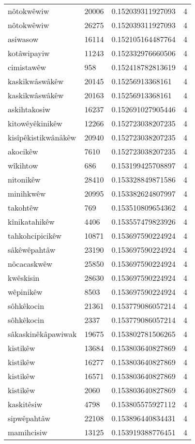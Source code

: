 \begin{longtable}{llll}
nôtokwêwiw & 20006 & 0.152039311927093 & 4 \\
nôtokwêwiw & 26275 & 0.152039311927093 & 4 \\
asiwasow & 16114 & 0.152105164487764 & 4 \\
kotâwipayiw & 11243 & 0.152332976660506 & 4 \\
cimistawêw & 958 & 0.152418782813619 & 4 \\
kaskikwâswâkêw & 20145 & 0.15256913368161 & 4 \\
kaskikwâswâkêw & 20163 & 0.15256913368161 & 4 \\
askihtakosiw & 16237 & 0.152691027905446 & 4 \\
kitowêyêkinikêw & 12266 & 0.152723038207235 & 4 \\
kisîpêkistikwânâkêw & 20940 & 0.152723038207235 & 4 \\
akocikêw & 7610 & 0.152723038207235 & 4 \\
wîkihtow & 686 & 0.153199425708897 & 4 \\
nitonikêw & 28410 & 0.153328849871586 & 4 \\
minihkwêw & 20995 & 0.153382624807997 & 4 \\
takohtêw & 769 & 0.153510809654362 & 4 \\
kînikatahikêw & 4406 & 0.153557479823926 & 4 \\
tahkohcipicikêw & 10871 & 0.153697590224924 & 4 \\
sâkêwêpahtâw & 23190 & 0.153697590224924 & 4 \\
nôcacaskwêw & 25850 & 0.153697590224924 & 4 \\
kwêskisin & 28630 & 0.153697590224924 & 4 \\
wêpinikêw & 8503 & 0.153697590224924 & 4 \\
sôhkêkocin & 21361 & 0.153779086057214 & 4 \\
sôhkêkocin & 2337 & 0.153779086057214 & 4 \\
sâkaskinêkâpawiwak & 19675 & 0.153802781506265 & 4 \\
kistikêw & 13684 & 0.153803640827869 & 4 \\
kistikêw & 16277 & 0.153803640827869 & 4 \\
kistikêw & 16571 & 0.153803640827869 & 4 \\
kistikêw & 2060 & 0.153803640827869 & 4 \\
kaskitêsiw & 4798 & 0.153805575927112 & 4 \\
sipwêpahtâw & 22108 & 0.153896440834431 & 4 \\
mamihcisiw & 13125 & 0.153919388776451 & 4 \\

\end{longtable}
